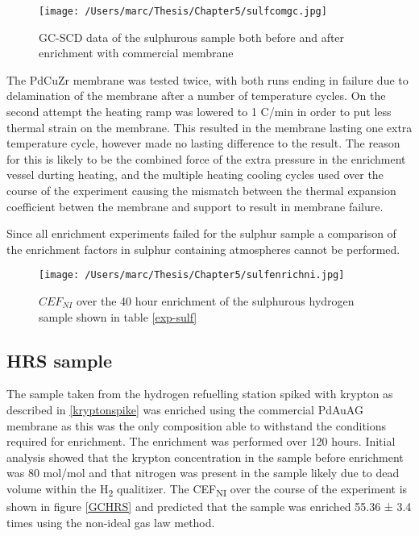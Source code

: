 \begin{figure}[H]
    \centering
    \texttt{[image: /Users/marc/Thesis/Chapter5/sulfcomgc.jpg]}
    \caption{GC-SCD data of the sulphurous sample both before and after enrichment with commercial membrane}
    \label{GCSULFCOMM}
\end{figure}

The PdCuZr membrane was tested twice, with both runs ending in failure due to delamination of the membrane after a number of temperature cycles. On the second attempt the heating ramp was lowered to 1 \textdegree C/min in order to put less thermal strain on the membrane. This resulted in the membrane lasting one extra temperature cycle, however made no lasting difference to the result. The reason for this is likely to be the combined force of the extra pressure in the enrichment vessel durting heating, and the multiple heating cooling cycles used over the course of the experiment causing the mismatch between the thermal expansion coefficient betwen the membrane and support to result in membrane failure. 

Since all enrichment experiments failed for the sulphur sample a comparison of the enrichment factors in sulphur containing atmospheres cannot be performed. 

\begin{landscape}
    \begin{figure}
        \centering
        \texttt{[image: /Users/marc/Thesis/Chapter5/sulfenrichni.jpg]}
        \caption{$CEF_{NI}$ over the 40 hour enrichment of the sulphurous hydrogen sample shown in table \ref{exp-sulf}}
        \label{GCSULF}
    \end{figure}
\end{landscape}

\subsection{HRS sample}
The sample taken from the hydrogen refuelling station spiked with krypton as described in \ref{kryptonspike} was enriched using the commercial PdAuAG membrane as this was the only composition able to withstand the conditions required for enrichment. The enrichment was performed over 120 hours. Initial analysis showed that the krypton concentration in the sample before enrichment was 80 \textmu mol/mol and that nitrogen was present in the sample likely due to dead volume within the H\textsubscript{2} qualitizer. The CEF\textsubscript{NI} over the course of the experiment is shown in figure \ref{GCHRS} and predicted that the sample was enriched 55.36 ± 3.4 times using the non-ideal gas law method.

